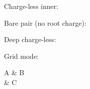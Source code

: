 \documentclass[varwidth=20cm, border=6pt]{standalone}
\begin{document}
Charge-less inner: 

Bare pair (no root charge): 

Deep charge-less: 

Grid mode:
\begin{tenkzcd}
  A  & B  \\
    & C
\end{tenkzcd}
\end{document}
